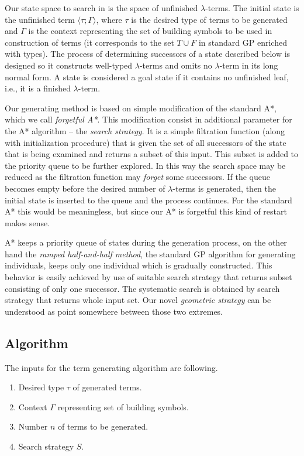 \documentclass[conference]{IEEEtran}
\newcommand{\lterm}{$\lambda$-term\xspace}
\newcommand{\lterms}{$\lambda$-terms\xspace}
\newcommand{\ul}[2]{\langle #1 ; #2 \rangle}
\begin{document}
Our state space to search in is the space of unfinished \lterms. 
The initial state is the unfinished term $\ul{\tau}{\Gamma}$, 
where $\tau$ is the desired type of
terms to be generated and $\Gamma$ is the context
representing the set of building symbols to be used in construction of
terms (it corresponds to the set $T \cup F$ in
standard GP enriched with types). The process of determining 
successors of a state described below is designed so it constructs well-typed 
\lterms and omits no \lterm in its long normal form. 
A state is considered a goal state if it contains no unfinished
leaf, i.e., it is a finished \lterm.

Our generating method is based on simple modification of the
standard A*, which we call \textit{forgetful A*}. This modification consist in 
additional parameter for the A* algorithm -- the \textit{search strategy}. 
It is a simple filtration function (along with initialization procedure)
that is given the set of all successors of the state that is being examined
and returns a subset of this input. This subset is added to the priority queue 
to be further explored. In this way the search space may be reduced as 
the filtration function may \textit{forget} some successors.
If the queue becomes empty before the desired number of \lterms
is generated, then the initial state is inserted to the queue
and the process continues. For the standard A* this would be meaningless,
but since our A* is forgetful this kind of restart makes sense.

A* keeps a priority queue of states during the generation process,
on the other hand the \textit{ramped half-and-half method}, 
the standard GP algorithm for generating individuals, 
keeps only one individual which is gradually constructed. This 
behavior is easily achieved by use of suitable search strategy 
that returns subset consisting of only one successor.
The systematic search is obtained by search strategy that 
returns whole input set.      
Our novel \textit{geometric strategy} can be understood as
point somewhere between those two extremes.

\subsection{Algorithm}

The inputs for the term generating algorithm are following.
\begin{enumerate}
 \item Desired type $\tau$ of generated terms.
 \item Context $\Gamma$ representing set of building symbols.
 \item Number $n$ of terms to be generated.
 \item Search strategy $S$. 
\end{enumerate}
\end{document}
